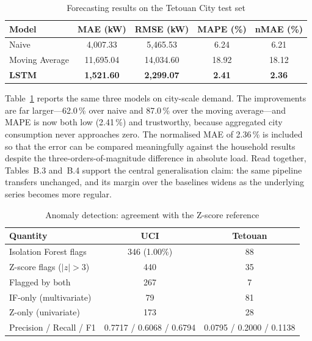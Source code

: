 \documentclass[11pt,a4paper]{article}
\begin{document}
\begin{table}[htbp]
\centering
\caption{Forecasting results on the Tetouan City test set}
\label{tab:tet}
\small
\renewcommand{\arraystretch}{1.3}
\begin{tabular}{|l|c|c|c|c|}
\hline
\textbf{Model} & \textbf{MAE (kW)} & \textbf{RMSE (kW)} & \textbf{MAPE (\%)} & \textbf{nMAE (\%)}\\ \hline
Naive & 4{,}007.33 & 5{,}465.53 & 6.24 & 6.21\\ \hline
Moving Average & 11{,}695.04 & 14{,}034.60 & 18.92 & 18.12\\ \hline
\textbf{LSTM} & \textbf{1{,}521.60} & \textbf{2{,}299.07} & \textbf{2.41} & \textbf{2.36}\\ \hline
\end{tabular}
\end{table}

Table~\ref{tab:tet} reports the same three models on city-scale demand. The improvements are far larger---62.0\,\% over naive and 87.0\,\% over the moving average---and MAPE is now both low (2.41\,\%) and trustworthy, because aggregated city consumption never approaches zero. The normalised MAE of 2.36\,\% is included so that the error can be compared meaningfully against the household results despite the three-orders-of-magnitude difference in absolute load. Read together, Tables~B.3 and~B.4 support the central generalisation claim: the same pipeline transfers unchanged, and its margin over the baselines widens as the underlying series becomes more regular.

\begin{table}[htbp]
\centering
\caption{Anomaly detection: agreement with the Z-score reference}
\label{tab:anom}
\small
\renewcommand{\arraystretch}{1.3}
\begin{tabular}{|l|c|c|}
\hline
\textbf{Quantity} & \textbf{UCI} & \textbf{Tetouan}\\ \hline
Isolation Forest flags & 346 (1.00\%) & 88\\ \hline
Z-score flags ($|z|>3$) & 440 & 35\\ \hline
Flagged by both & 267 & 7\\ \hline
IF-only (multivariate) & 79 & 81\\ \hline
Z-only (univariate) & 173 & 28\\ \hline
Precision / Recall / F1 & 0.7717 / 0.6068 / 0.6794 & 0.0795 / 0.2000 / 0.1138\\ \hline
\end{tabular}
\end{table}
\end{document}
